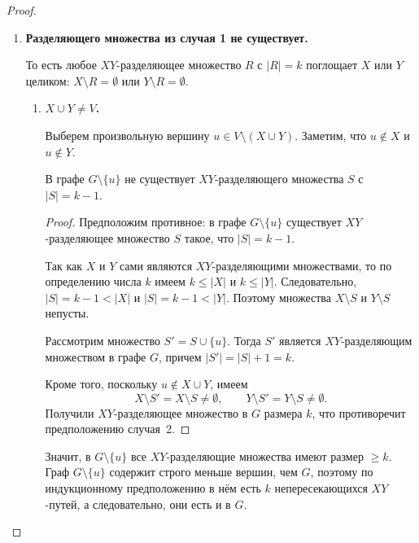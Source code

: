 \begin{proof}
\begin{enumerate}
		Отсюда: любое $XR$-разделяющее множество в $G_X$ имеет
		размер $\geq k$. По индукционному предположению в $G_X$
		найдётся $k$ непересекающихся $XR$-путей; аналогично в
		$G_Y$ --- $k$ непересекающихся $YR$-путей.
		Склеивая каждый $XR$-путь с соответствующим $YR$-путём
		через вершину $R$ и пользуясь тем, что $V_X \cap V_Y = \emptyset$,
		получаем $k$ попарно непересекающихся $XY$-путей.
		
		\item \textbf{Разделяющего множества из случая 1 не существует.}
		
		То есть любое $XY$-разделяющее множество $R$ с $|R| = k$
		поглощает $X$ или $Y$ целиком: $X \setminus R = \emptyset$
		или $Y \setminus R = \emptyset$.
		
		\begin{enumerate}
			\item \textbf{$X \cup Y \neq V$.}
			
			Выберем произвольную вершину $u \in V \setminus (X \cup Y)$. Заметим, что $u \notin X$
			и $u \notin Y$.
			
			\begin{Statement}{}{}
				В графе $G \setminus \{u\}$ не существует
				$XY$-разделяющего множества $S$ с $|S| = k - 1$.
			\end{Statement}
			
			\begin{proof}
				Предположим противное: в графе $G \setminus \{u\}$ существует
				$XY$-разделяющее множество $S$ такое, что $|S| = k - 1$.
				
				Так как $X$ и $Y$ сами являются $XY$-разделяющими множествами, то
				по определению числа $k$ имеем $k \le |X|$ и $k \le |Y|$.
				Следовательно, $|S| = k - 1 < |X|$ и $|S| = k - 1 < |Y|$.
				Поэтому множества $X \setminus S$ и $Y \setminus S$ непусты.
				
				Рассмотрим множество $S' = S \cup \{u\}$. Тогда $S'$ является
				$XY$-разделяющим множеством в графе $G$, причем
				$|S'| = |S| + 1 = k.$
				
				Кроме того, поскольку $u \notin X \cup Y$, имеем
				\[
				X \setminus S' = X \setminus S \neq \emptyset,
				\qquad
				Y \setminus S' = Y \setminus S \neq \emptyset.
				\]
				Получили $XY$-разделяющее множество в $G$ размера $k$, что
				противоречит предположению случая~2.
			\end{proof}
			
			Значит, в $G \setminus \{u\}$ все $XY$-разделяющие
			множества имеют размер $\geq k$. Граф $G \setminus \{u\}$
			содержит строго меньше вершин, чем $G$, поэтому по
			индукционному предположению в нём есть $k$ непересекающихся
			$XY$-путей, а следовательно, они есть и в $G$.
			

\end{enumerate}
\end{enumerate}
\end{proof}
